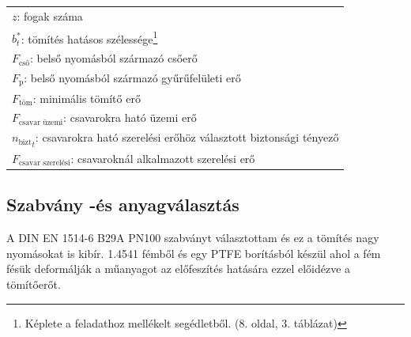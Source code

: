\begin{center}
	\begin{tabular}{l}
		$z$: fogak száma \siunit{}{db} \\
		$b_t^*$: tömítés hatásos szélessége\protect\footnote{Képlete a feladathoz mellékelt segédletből. (8. oldal, 3. táblázat)} \siunit{}{\mm} \\
		$F_\text{cső}$: belső nyomásból származó csőerő \siunit{}{\newton} \\
		$F_\text{p}$: belső nyomásból származó gyűrűfelületi erő \siunit{}{\newton} \\
		$F_\text{töm}$: minimális tömítő erő \siunit{}{\newton} \\
		$F_\text{csavar üzemi}$: csavarokra ható üzemi erő \siunit{}{\newton} \\
		${n_\text{bizt}}_t$: csavarokra ható szerelési erőhöz választott biztonsági tényező \siunit{}{-} \\
		$F_\text{csavar szerelési}$: csavaroknál alkalmazott szerelési erő \siunit{}{\newton} \\
	\end{tabular}
\end{center}

\newpage
\subsection{Szabvány -és anyagválasztás}
A DIN EN 1514-6 B29A PN100 szabványt választottam és ez a tömítés nagy nyomásokat is kibír. 1.4541 fémből és egy PTFE borításból készül ahol a fém fésük deformálják a műanyagot az előfeszítés hatására ezzel előidézve a tömítőerőt.

